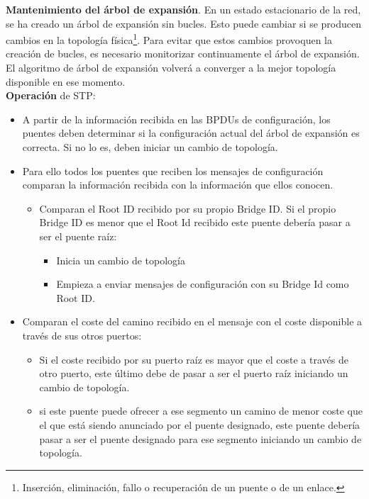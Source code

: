 \documentclass[10pt,portrait, twocolumn]{article}
\begin{document}
\textbf{Mantenimiento del árbol de expansión}. En un estado estacionario de la red, se ha creado un árbol de expansión sin bucles. Esto puede cambiar si se producen cambios en la topología física\footnote{Inserción, eliminación, fallo o recuperación de un puente o de un enlace.}. Para evitar que estos cambios provoquen la creación de bucles, es necesario monitorizar continuamente el árbol de expansión. El algoritmo de árbol de expansión volverá a converger a la mejor topología disponible en ese momento.\\

\textbf{Operación} de STP:

	\begin{itemize}
	\item A partir de la información recibida en las BPDUs de configuración, los puentes deben determinar si la configuración actual del árbol de expansión es correcta. Si no lo es, deben iniciar un cambio de topología.
	\item Para ello todos los puentes que reciben los mensajes de configuración comparan la información recibida con la información que ellos conocen.
		\begin{itemize}
		\item Comparan el Root ID recibido por su propio Bridge ID. Si el propio Bridge ID es menor que el Root Id recibido este puente debería pasar a ser el puente raíz:
			\begin{itemize}
			\item Inicia un cambio de topología
			\item Empieza a enviar mensajes de configuración con su Bridge Id como Root ID.
			\end{itemize}
		\end{itemize}
		\item Comparan el coste del camino recibido en el mensaje con el coste disponible a través de sus otros puertos:
			\begin{itemize}
			\item Si el coste recibido por su puerto raíz es mayor que el coste a través de otro puerto, este último debe de pasar a ser el puerto raíz iniciando un cambio de topología.
			\item si este puente puede ofrecer a ese segmento un camino de menor coste que el que está siendo anunciado por el puente designado, este puente debería pasar a ser el puente designado para ese segmento iniciando un cambio de topología.
			\end{itemize}
	\end{itemize}
	
\end{document}
